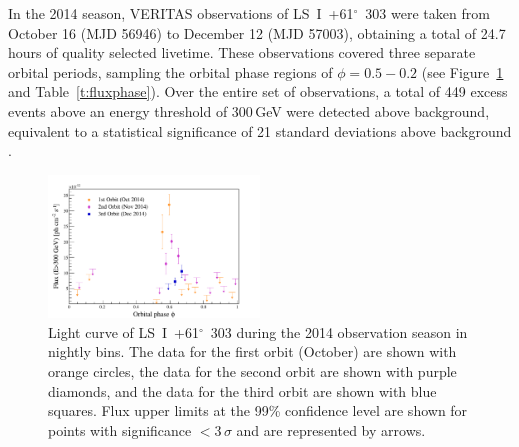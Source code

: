 \documentclass[preprint2]{aastex}
\newcommand{\lsi}{LS~I~+61$^{\circ}$~303}
\newcommand{\gev}{\,GeV}
\begin{document}
In the 2014 season, VERITAS observations of \lsi{} were taken from October 16 (MJD 56946) to  December 12 (MJD 57003), obtaining a total of 24.7 hours of quality selected livetime. These observations covered three separate orbital periods, sampling the orbital phase regions of $\phi = 0.5-0.2$ (see Figure~\ref{f:fluxphase} and Table~\ref{t:fluxphase}). Over the entire set of observations, a total of 449 excess events above an energy threshold of 300\gev{} were detected above background, equivalent to a statistical significance of 21 standard deviations above background \citep[$21\sigma$, calculated using Equation 17 of][]{LiMa}.

\begin{figure}[ht]
\centering
\includegraphics[width=0.5\textwidth]{./figs/fluxvphase_300.pdf}
\caption{Light curve of \lsi{} during the 2014 observation season in nightly bins. %
The data for the first orbit (October) are shown with orange circles, the data for the second orbit are shown with purple diamonds, and the data for the third orbit are shown with blue squares. Flux upper limits at the 99\% confidence level \citep[using the unbounded approach of][]{Rolke} are shown for points with significance $<3\,\sigma$ and are represented by arrows.
}
\label{f:fluxphase}
\end{figure}
\end{document}
